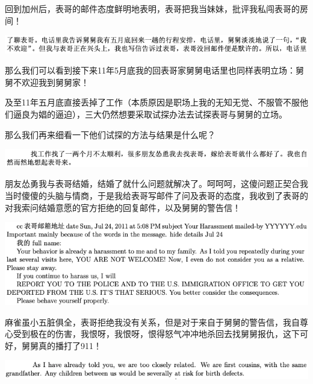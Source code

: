 \documentclass[9pt, b5paper]{article}
\begin{document}
回到加州后，表哥的邮件态度鲜明地表明，表哥把我当妹妹，批评我私闯表哥的房间！

\begin{center}
\includegraphics[width=.9\linewidth]{./pic/backups_plans_20210412_171851.png}
\end{center}

那么我们可以看到接下来11年5月底我的回表哥家舅舅电话里也同样表明立场：舅舅不欢迎我到舅舅家！

及至11年五月底直接丢掉了工作（本质原因是职场上我的无知无觉、不服管不服他们逼良为娼的逼迫），三大仍然想要采取试探办法去试探表哥与舅舅的立场。

那么我们再来细看一下他们试探的方法与结果是什么呢？

\begin{center}
\includegraphics[width=.9\linewidth]{./pic/backups_plans_20210412_172222.png}
\end{center}

朋友怂勇我与表哥结婚，结婚了就什么问题就解决了。呵呵呵，这傻问题正契合我当时傻傻的头脑与情商，于是我给表哥写邮件了问及表哥的态度，我收到了表哥的对我索问结婚意愿的官方拒绝的回复邮件，以及舅舅的警告信！

\begin{center}
\includegraphics[width=.9\linewidth]{./pic/backups_plans_20210412_172303.png}
\end{center}

麻雀虽小五脏俱全，表哥拒绝我没有关系，但是对于来自于舅舅的警告信，我自尊心受到极在的伤害，我恨呀，我恨呀，恨得怒气冲冲地杀回去找舅舅报仇，这下可好，舅舅真的播打了911！

\begin{center}
\includegraphics[width=.9\linewidth]{./pic/backups_plans_20210412_172426.png}
\end{center}
\end{document}
